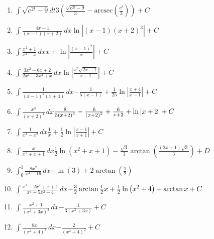 {\begin{enumerate}
\item {$\displaystyle{\int \sqrt{e^{2t}-9}dt}$}{$3\left( \frac{\sqrt{e^{2t}-9}}{3}-{\text{arcsec}}\left( \frac{e^{t}}{3}%
\right) \right) +C$}

\item {$\displaystyle{\int \frac{4x-1}{(x-1)(x+2)}\, dx}$}{$\ln \left\vert \left( x-1\right) \left( x+2\right) ^{3}\right\vert +C$}

\item {$\displaystyle{\int \frac{x^{2}+1}{x^{2}-x}\, dx}$}{$x+\ln \left\vert \frac{\left( x-1\right) ^{2}}{x}\right\vert +C$ }

\item {$\displaystyle{\int \frac{3x^{2}-6x+2}{2x^{3}-3x^{2}+x}\, dx}$}{$\ln \left\vert \frac{x^{2}\sqrt{2x-1}}{x-1}\right\vert +C$}

\item {$\displaystyle{\int \frac{1}{(x-1)^{2}(x+4)}\, dx}$}{$-\frac{1}{5\left( x-1\right) }+\frac{1}{25}\ln \left\vert \frac{x+4}{x-1}%
\right\vert +C$}

\item {$\displaystyle{\int \frac{x^{3}}{(x+2)^{4}}\, dx}$}{$\frac{8}{3\left( x+2\right) ^{3}}-\frac{6}{\left( x+2\right) ^{2}}+\frac{6}{%
x+2}+\ln \left\vert x+2\right\vert +C$}

\item {$\displaystyle{\int \frac{1}{x^{4}-x^{2}}\, dx}$}{$\frac{1}{x}+\frac{1}{2}\ln \left\vert \frac{x-1}{x+1}\right\vert +C$}

\item {$\displaystyle{\int \frac{x}{x^{2}+x+1}\, dx}$}{$\frac{1}{2}\ln \left( x^{2}+x+1\right) -\frac{\sqrt{3}}{3}\arctan \left( 
\frac{\left( 2x+1\right) \sqrt{3}}{3}\right) +D$}

\item {$\displaystyle{\int_{0}^{1}\frac{8x^{2}}{x^{4}-16}\, dx}$}{$-\ln \left( 3\right) +2\arctan \left( \frac{1}{2}\right) $}

\item {$\displaystyle{\int \frac{x^{3}-2x^{2}+x+1}{x^{4}+5x^{2}+4}\, dx}$}{$-\frac{3}{2}\arctan \frac{%
1}{2}x+\frac{1}{2}\ln \left( x^{2}+4\right) +\arctan x+C $}

\item {$\displaystyle{\int \frac{x^{2}+1}{(x^{3}+3x)^{2}}\, dx}$}{$-\frac{1}{3\left( x^{3}+3x\right) }+C$}

\item {$\displaystyle{\int \frac{8x}{(x^{2}+4)^{3}}\, dx}$}{$-\frac{2}{\left( x^{2}+4\right) ^{2}}+C$}


\end{enumerate}}
